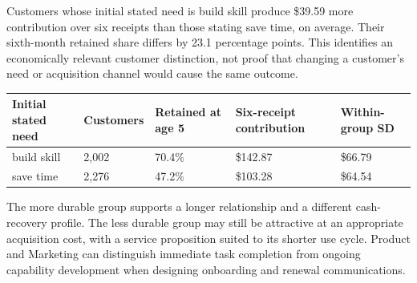\documentclass[10pt]{article}
\begin{document}
\NewPage
{}
Customers whose initial stated need is build skill produce \$39.59 more contribution over six receipts than those stating save time, on average. Their sixth-month retained share differs by 23.1 percentage points. This identifies an economically relevant customer distinction, not proof that changing a customer's need or acquisition channel would cause the same outcome.
\par\begin{tabularx}{\linewidth}{@{}YYYYY@{}}\toprule
\textbf{Initial stated need} & \textbf{Customers} & \textbf{Retained at age 5} & \textbf{Six-receipt contribution} & \textbf{Within-group SD}\\\midrule
build skill & 2,002 & 70.4\% & \$142.87 & \$66.79\\
save time & 2,276 & 47.2\% & \$103.28 & \$64.54\\
\bottomrule\end{tabularx}\par
{}
The more durable group supports a longer relationship and a different cash-recovery profile. The less durable group may still be attractive at an appropriate acquisition cost, with a service proposition suited to its shorter use cycle. Product and Marketing can distinguish immediate task completion from ongoing capability development when designing onboarding and renewal communications.
\end{document}
